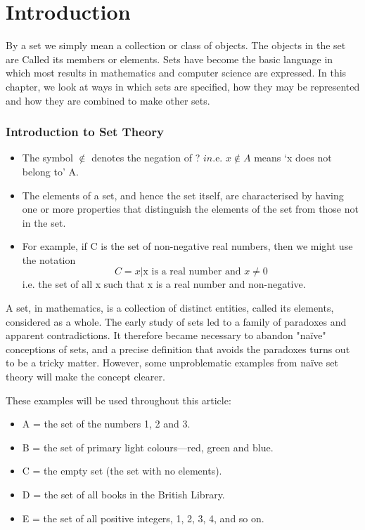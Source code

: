\documentclass[11pt,a4paper,titlepage,oneside,openany]{article}
\numberwithin{equation}{section}
\numberwithin{algorithm}{section}
\numberwithin{figure}{section}
\numberwithin{table}{section}
\begin{document}
\section{Introduction} %
\smallskip 
By a set we simply mean a collection or class of objects. The objects in the set are Called its
members or elements. Sets have become the basic language in which most results in mathematics
and computer science are expressed. 
In this chapter, we look at ways in which sets are speciﬁed,
how they may be represented and how they are combined to make other sets.
\smallskip 
\smallskip 
\frametitle{Introduction to Set Theory}
\begin{itemize}
\item The symbol $\notin$ denotes the negation of ? $in$.e. $x \notin A$ means ‘x does not
belong to’ A.
\item The elements of a set, and hence the set itself, are characterised by having
one or more properties that distinguish the elements of the set from those
not in the set.
\item For example, if C is the set of non-negative real numbers, then we
might use the notation
\[C = {x | \mbox{x is a real number and }x \neq 0}\]
i.e. the set of all x such that x is a real number and non-negative.
\end{itemize}
\smallskip 

	A set, in mathematics, is a collection of distinct entities, called its elements, considered as a whole. The early study of sets led to a family of paradoxes and apparent contradictions. It therefore became necessary to abandon "naïve" conceptions of sets, and a precise definition that avoids the paradoxes turns out to be a tricky matter. However, some unproblematic examples from naïve set theory will make the concept clearer. 

	These examples will be used throughout this article:
	
	\begin{itemize}
		\item A = the set of the numbers 1, 2 and 3.
		\item B = the set of primary light colours—red, green and blue.
		\item C = the empty set (the set with no elements).
		\item D = the set of all books in the British Library.
		\item E = the set of all positive integers, 1, 2, 3, 4, and so on.
	\end{itemize}
	
\end{document}
